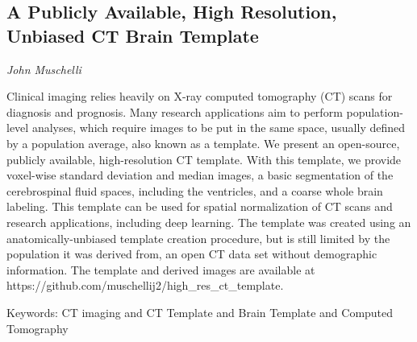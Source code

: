 \documentclass[../booklet.tex]{subfiles}
\begin{document}
\subsection[A Publicly Available, High Resolution, Unbiased CT Brain Template. {\it John Muschelli and John Muschelli}]{A Publicly Available, High Resolution, Unbiased CT Brain Template}

\begin{center}
  {\it John Muschelli}
\end{center}

\vskip 0.8cm


  Clinical imaging relies heavily on X-ray computed tomography (CT) scans for diagnosis and prognosis. Many research applications aim to perform population-level analyses, which require images to be put in the same space, usually defined by a population average, also known as a template. We present an open-source, publicly available, high-resolution CT template. With this template, we provide voxel-wise standard deviation and median images, a basic segmentation of the cerebrospinal fluid spaces, including the ventricles, and a coarse whole brain labeling. This template can be used for spatial normalization of CT scans and research applications, including deep learning. The template was created using an anatomically-unbiased template creation procedure, but is still limited by the population it was derived from, an open CT data set without demographic information. The template and derived images are available at https://github.com/muschellij2/high\_res\_ct\_template.

  Keywords: CT imaging and CT Template and Brain Template and Computed Tomography
  
\end{document}
